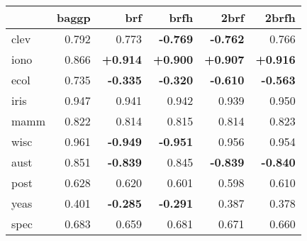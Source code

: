 \begin{tabular}{lrrrrr}
\toprule
{} &  baggp &    brf &   brfh &   2brf &  2brfh \\
\midrule
clev & 0.792 & 0.773 &    \textbf{-0.769} &    \textbf{-0.762} & 0.766 \\
iono & 0.866 & \textbf{+0.914} & \textbf{+0.900} & \textbf{+0.907} & \textbf{+0.916} \\
ecol & 0.735 &    \textbf{-0.335} &    \textbf{-0.320} &    \textbf{-0.610} &    \textbf{-0.563} \\
iris & 0.947 & 0.941 & 0.942 & 0.939 & 0.950 \\
mamm & 0.822 & 0.814 & 0.815 & 0.814 & 0.823 \\
wisc & 0.961 &    \textbf{-0.949} &    \textbf{-0.951} & 0.956 & 0.954 \\
aust & 0.851 &    \textbf{-0.839} & 0.845 &    \textbf{-0.839} &    \textbf{-0.840} \\
post & 0.628 & 0.620 & 0.601 & 0.598 & 0.610 \\
yeas & 0.401 &    \textbf{-0.285} &    \textbf{-0.291} & 0.387 & 0.378 \\
spec & 0.683 & 0.659 & 0.681 & 0.671 & 0.660 \\
\bottomrule
\end{tabular}
